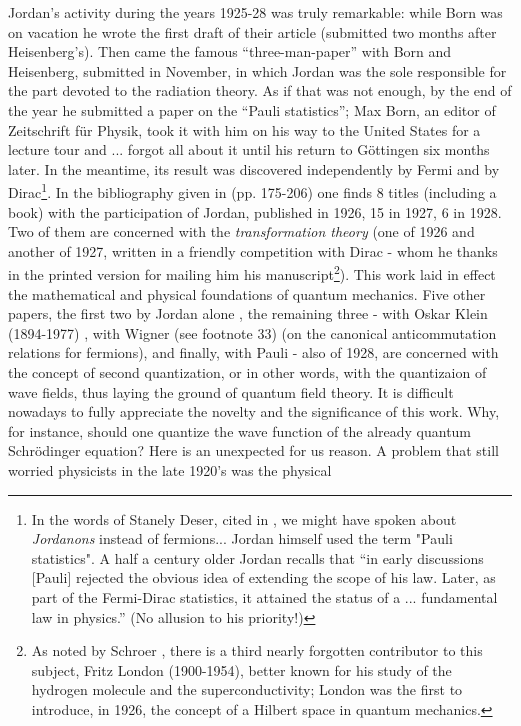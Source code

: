 \documentclass[12pt]{article}
\begin{document}
Jordan's activity during the years 1925-28 was truly remarkable: while Born was on vacation he wrote the first 
draft of their article (submitted two months after Heisenberg's). Then came the famous ``three-man-paper'' with 
Born and Heisenberg, submitted in November, in which Jordan was the sole responsible for the part devoted to the 
radiation theory. As if that was not enough, by the end of the year he submitted a paper on the ``Pauli statistics''; 
Max Born, an editor of Zeitschrift f\"ur Physik, took it with him on his way to the United States for a lecture tour 
and ... forgot all about it until his return to G\"ottingen six months later. In the meantime, its result was discovered 
independently by Fermi and by Dirac\footnote{In the words of Stanely Deser, cited in \cite{S06}, we might have spoken 
about {\it Jordanons} instead of fermions... Jordan himself used the term "Pauli statistics". A half a century older Jordan 
\cite{J} recalls that ``in early discussions [Pauli] rejected the obvious idea of extending the scope of his law. Later,
as part of the Fermi-Dirac statistics, it attained the status of a ... fundamental law in physics.'' (No allusion to 
his priority!)}. In the bibliography given in \cite{PJ07} 
(pp. 175-206) one finds 8 titles (including a book) with the participation of Jordan, published in 1926, 15 in 1927, 6 in 1928. 
Two of them are concerned with the {\it transformation theory} (one of 1926 and another of 1927, written in a friendly 
competition with Dirac - whom he thanks in the printed version for mailing him his manuscript\footnote{As noted by Schroer \cite{S06},
there is a third nearly forgotten contributor to this subject, Fritz London (1900-1954), better known for his study of the hydrogen 
molecule and the superconductivity; London was the first to introduce, in 1926, the concept of a Hilbert space in quantum mechanics.}). 
This work laid in effect the mathematical and physical foundations of quantum mechanics. Five other papers, the first two by Jordan alone 
\cite{J27}, the remaining three - with Oskar Klein (1894-1977) \cite{JK27}, with Wigner (see footnote 33) \cite{JW28} (on the canonical 
anticommutation relations for fermions), and finally, with Pauli - also of 1928, are concerned with the concept of second quantization, 
or in other words, with the quantizaion of wave fields, thus laying the ground of quantum field theory. It is difficult nowadays to fully 
appreciate the novelty and the significance of this work. Why, for instance, should one quantize the wave function of the already quantum
Schr\"odinger equation? Here is an unexpected for us reason. A problem that still worried physicists in the late 1920's was the physical 
\end{document}
